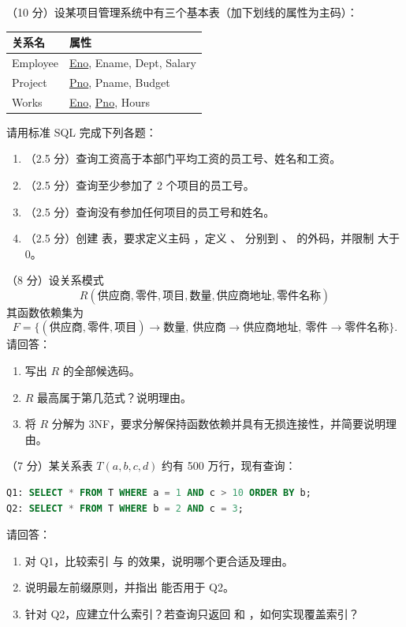 \documentclass[a4paper,11pt]{article}
\begin{document}

\q （10 分）设某项目管理系统中有三个基本表（加下划线的属性为主码）：
\begin{center}\small
\begin{tabular}{ll}
\toprule
关系名 & 属性 \\
\midrule
Employee & \underline{Eno}, Ename, Dept, Salary \\
Project & \underline{Pno}, Pname, Budget \\
Works & \underline{Eno}, \underline{Pno}, Hours \\
\bottomrule
\end{tabular}
\end{center}
请用标准 SQL 完成下列各题：
\begin{enumerate}[label=（\arabic*）, leftmargin=2.4em, itemsep=1pt]
  \item （2.5 分）查询工资高于本部门平均工资的员工号、姓名和工资。
  \item （2.5 分）查询至少参加了 2 个项目的员工号。
  \item （2.5 分）查询没有参加任何项目的员工号和姓名。
  \item （2.5 分）创建  表，要求定义主码 ，定义 、 分别到 、 的外码，并限制  大于 0。
\end{enumerate}
\anslines{9cm}

\q （8 分）设关系模式
\[
R(\text{供应商},\text{零件},\text{项目},\text{数量},\text{供应商地址},\text{零件名称})
\]
其函数依赖集为
\[
F=\{(\text{供应商},\text{零件},\text{项目})\to\text{数量},\ \text{供应商}\to\text{供应商地址},\ \text{零件}\to\text{零件名称}\}.
\]
请回答：
\begin{enumerate}[label=（\arabic*）, leftmargin=2.4em, itemsep=1pt]
  \item 写出 $R$ 的全部候选码。
  \item $R$ 最高属于第几范式？说明理由。
  \item 将 $R$ 分解为 3NF，要求分解保持函数依赖并具有无损连接性，并简要说明理由。
\end{enumerate}
\anslines{7cm}

\q （7 分）某关系表 $T(a,b,c,d)$ 约有 500 万行，现有查询：
\begin{lstlisting}[language=SQL]
Q1: SELECT * FROM T WHERE a = 1 AND c > 10 ORDER BY b;
Q2: SELECT * FROM T WHERE b = 2 AND c = 3;
\end{lstlisting}
请回答：
\begin{enumerate}[label=（\arabic*）, leftmargin=2.4em, itemsep=1pt]
  \item 对 Q1，比较索引  与  的效果，说明哪个更合适及理由。
  \item 说明最左前缀原则，并指出  能否用于 Q2。
  \item 针对 Q2，应建立什么索引？若查询只返回  和 ，如何实现覆盖索引？
\end{enumerate}
\anslines{7cm}
\end{document}

